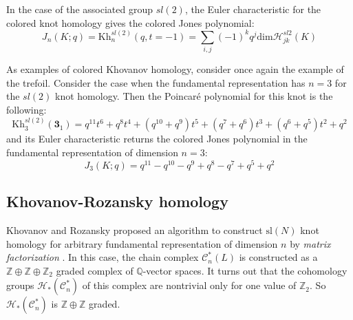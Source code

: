 \documentclass[a4paper,titlepage,twoside]{book}
\begin{document}
In the case of the associated group $sl{(2)}$, the Euler characteristic for the colored knot homology gives the colored Jones polynomial:
\begin{equation}
J_n(K;q) = \text{Kh}_n^{sl{(2)}}{(q,t=-1)} = \sum_{i,j} (-1)^k q^j \text{dim}{ \mathcal{H}_{jk}^{sl{2}}(K) }  \label{eq:eulerJonessl2homo00}
\end{equation}



As examples of colored Khovanov homology, consider once again the example of the trefoil.  Consider the case when the fundamental representation has $n=3$ for the $sl{(2)}$ knot homology.  Then the Poincar\'{e} polynomial for this knot is the following:
\begin{equation}
  \text{Kh}_3^{sl{(2)}}{ (\mathbf{3}_1)} = q^{11} t^{6} + q^{8} t^{4} + {\left(q^{10} + q^{9}\right)} t^{5} + {\left(q^{7} + q^{6}\right)} t^{3} + {\left(q^{6} + q^{5}\right)} t^{2} + q^{2}
\end{equation}
and its Euler characteristic returns the colored Jones polynomial in the fundamental representation of dimension $n=3$:
\begin{equation}
  J_3{(K;q)} = q^{11} - q^{10} - q^{9} + q^{8} - q^{7} + q^{5} + q^{2}
\end{equation}

\subsection{Khovanov-Rozansky homology}

Khovanov and Rozansky proposed an algorithm to construct $\text{sl}{(N)}$ knot homology for arbitrary fundamental representation of dimension $n$ by \emph{matrix factorization} \cite{KhovanovRozansky2004}.  In this case, the chain complex $\mathcal{C}^*_n{(L)}$ is constructed as a $\mathbb{Z} \oplus \mathbb{Z} \oplus \mathbb{Z}_2$ graded complex of $\mathbb{Q}$-vector spaces.  It turns out that the cohomology groups $\mathcal{H}_*{ (\mathcal{C}^*_n)}$ of this complex are nontrivial only for one value of $\mathbb{Z}_2$.  So $\mathcal{H}_*{ (\mathcal{C}^*_n)}$ is $\mathbb{Z}  \oplus \mathbb{Z}$ graded.  
\end{document}

